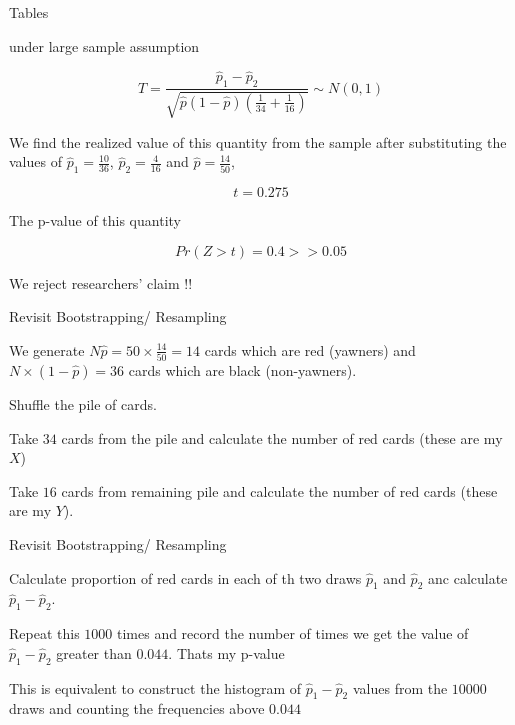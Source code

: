 \documentclass{beamer}\usepackage[]{graphicx}\usepackage[]{color}
\begin{document}
\begin{frame}[fragile]{Tables}

under large sample assumption

$$ T = \frac{\hat{p}_{1} - \hat{p}_{2}}{\sqrt{\hat{p}(1- \hat{p}) (\frac{1}{34} + \frac{1}{16})}} \sim N(0,1) $$

We find the realized value of this quantity from the sample after substituting the values of $\hat{p}_{1} = \frac{10}{36} $, $\hat{p}_{2} = \frac{4}{16}$ and $\hat{p}= \frac{14}{50}$, \pause \newline

$$ t = 0.275 $$ \pause 

The p-value of this quantity

$$ Pr \left ( Z > t \right) = 0.4  >> 0.05$$ \pause 

We reject researchers' claim !!

\end{frame}


\begin{frame}[fragile]{Revisit Bootstrapping/ Resampling}

We generate $N \hat{p} = 50 \times \frac{14}{50} = 14$ cards which are red (yawners) and $N \times (1- \hat{p}) = 36$ cards which are black (non-yawners). \pause \newline

Shuffle the pile of cards. \pause \newline

Take $34$ cards from the pile and calculate the number of red cards (these are my $X$) \pause 
\newline

Take $16$ cards from remaining pile and calculate the number of red cards (these are my $Y$).
\pause \newline

\end{frame}



\begin{frame}[fragile]{Revisit Bootstrapping/ Resampling}

Calculate proportion of red cards in each of th two draws $\hat{p}_{1}$ and $\hat{p}_{2}$ anc calculate $\hat{p}_{1} - \hat{p}_{2}$. \pause \newline

Repeat this $1000$ times and record the number of times we get the value of $\hat{p}_{1} - \hat{p}_{2}$ greater than $0.044$. Thats my p-value \pause \newline

This is equivalent to construct the histogram of $\hat{p}_{1} - \hat{p}_{2}$ values from the $10000$ draws and counting the frequencies above $0.044$

\end{frame}
\end{document}
